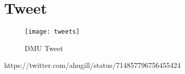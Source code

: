 \section{Tweet}

\begin{figure}[h!]
  \centering
  \texttt{[image: tweets]}
\caption[DMU Tweet]{DMU Tweet}
\label{fig:tweet}
\end{figure}

https://twitter.com/ahugill/status/714857796756455424


\stopcontents[chapters]
